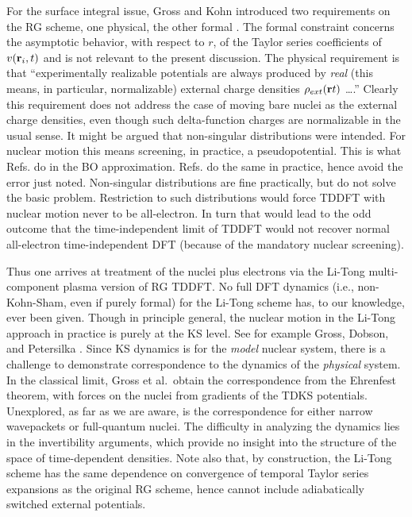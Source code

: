 For the surface integral issue, Gross and Kohn introduced two requirements
on the RG scheme, one physical, the other formal \cite{GrossKohn90}. The
formal constraint concerns the asymptotic behavior, with respect to $r$, of
the Taylor series coefficients of $v({\bf r}_{i},t)$ and is not relevant to
the present discussion. The physical requirement is that ``experimentally
realizable potentials are always produced by {\em real} (this means, in
particular, normalizable) external charge densities $\rho _{ext}({\bf r}t)$
\ldots .'' Clearly this requirement does not address the case of moving bare
nuclei as the external charge densities, even though such delta-function
charges are normalizable in the usual sense. It might be argued that
non-singular distributions were intended. For nuclear motion this means
screening, in practice, a pseudopotential. This is what Refs. %
 do in the BO approximation. Refs. %
 do the same in practice, hence avoid the error
just noted. Non-singular distributions are fine practically, but do not
solve the basic problem. Restriction to such distributions would force TDDFT
with nuclear motion never to be all-electron. In turn that would lead to the
odd outcome that the time-independent limit of TDDFT would not recover
normal all-electron time-independent DFT (because of the mandatory nuclear
screening).

Thus one arrives at treatment of the nuclei plus electrons via the Li-Tong %
\cite{LiTong86} multi-component plasma version of RG TDDFT. No full DFT
dynamics (i.e., non-Kohn-Sham, even if purely formal) for the Li-Tong scheme
has, to our knowledge, ever been given. Though in principle general, the
nuclear motion in the Li-Tong approach in practice is purely at the KS
level. See for example Gross, Dobson, and Petersilka \cite{Gross96}. Since
KS dynamics is for the {\em model} nuclear system, there is a challenge to
demonstrate correspondence to the dynamics of the {\em physical} system. In
the classical limit, Gross et al.~obtain the correspondence from the
Ehrenfest theorem, with forces on the nuclei from gradients of the TDKS
potentials. Unexplored, as far as we are aware, is the correspondence for
either narrow wavepackets or full-quantum nuclei.\cite{Xchneglect} The
difficulty in analyzing the dynamics lies in the invertibility arguments,
which provide no insight into the structure of the space of time-dependent
densities. Note also that, by construction, the Li-Tong scheme has the same
dependence on convergence of temporal Taylor series expansions as the
original RG scheme, hence cannot include adiabatically switched external
potentials.

